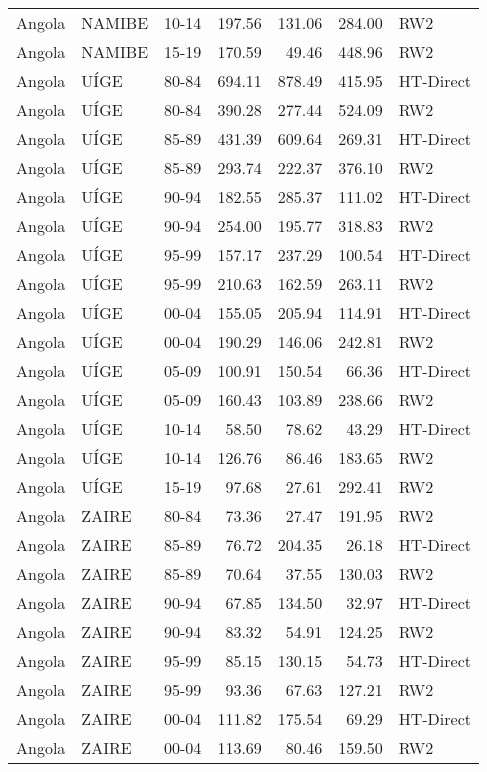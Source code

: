 \begin{longtable}{lllrrrl}
  Angola & NAMIBE & 10-14 & 197.56 & 131.06 & 284.00 & RW2 \\ 
  Angola & NAMIBE & 15-19 & 170.59 & 49.46 & 448.96 & RW2 \\ 
  Angola & UÍGE & 80-84 & 694.11 & 878.49 & 415.95 & HT-Direct \\ 
  Angola & UÍGE & 80-84 & 390.28 & 277.44 & 524.09 & RW2 \\ 
  Angola & UÍGE & 85-89 & 431.39 & 609.64 & 269.31 & HT-Direct \\ 
  Angola & UÍGE & 85-89 & 293.74 & 222.37 & 376.10 & RW2 \\ 
  Angola & UÍGE & 90-94 & 182.55 & 285.37 & 111.02 & HT-Direct \\ 
  Angola & UÍGE & 90-94 & 254.00 & 195.77 & 318.83 & RW2 \\ 
  Angola & UÍGE & 95-99 & 157.17 & 237.29 & 100.54 & HT-Direct \\ 
  Angola & UÍGE & 95-99 & 210.63 & 162.59 & 263.11 & RW2 \\ 
  Angola & UÍGE & 00-04 & 155.05 & 205.94 & 114.91 & HT-Direct \\ 
  Angola & UÍGE & 00-04 & 190.29 & 146.06 & 242.81 & RW2 \\ 
  Angola & UÍGE & 05-09 & 100.91 & 150.54 & 66.36 & HT-Direct \\ 
  Angola & UÍGE & 05-09 & 160.43 & 103.89 & 238.66 & RW2 \\ 
  Angola & UÍGE & 10-14 & 58.50 & 78.62 & 43.29 & HT-Direct \\ 
  Angola & UÍGE & 10-14 & 126.76 & 86.46 & 183.65 & RW2 \\ 
  Angola & UÍGE & 15-19 & 97.68 & 27.61 & 292.41 & RW2 \\ 
  Angola & ZAIRE & 80-84 & 73.36 & 27.47 & 191.95 & RW2 \\ 
  Angola & ZAIRE & 85-89 & 76.72 & 204.35 & 26.18 & HT-Direct \\ 
  Angola & ZAIRE & 85-89 & 70.64 & 37.55 & 130.03 & RW2 \\ 
  Angola & ZAIRE & 90-94 & 67.85 & 134.50 & 32.97 & HT-Direct \\ 
  Angola & ZAIRE & 90-94 & 83.32 & 54.91 & 124.25 & RW2 \\ 
  Angola & ZAIRE & 95-99 & 85.15 & 130.15 & 54.73 & HT-Direct \\ 
  Angola & ZAIRE & 95-99 & 93.36 & 67.63 & 127.21 & RW2 \\ 
  Angola & ZAIRE & 00-04 & 111.82 & 175.54 & 69.29 & HT-Direct \\ 
  Angola & ZAIRE & 00-04 & 113.69 & 80.46 & 159.50 & RW2 \\ 

\end{longtable}
